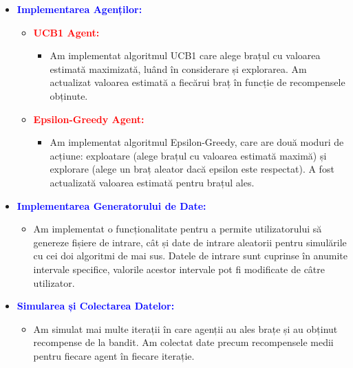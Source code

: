 \documentclass{article}
\begin{document}
\begin{itemize}
\item\textbf{\textcolor{blue}{Implementarea Agenților:}} \vspace{2mm}
\begin{itemize}
      \item \textbf{\textcolor{red}{UCB1 Agent:}} \vspace{2mm}
      \begin{itemize}
         \item  Am implementat algoritmul UCB1 care alege brațul cu valoarea estimată maximizată, luând în considerare și explorarea. Am actualizat valoarea estimată a fiecărui braț în funcție de recompensele obținute.\vspace{2mm}
      \end{itemize}
    \item \textbf{\textcolor{red}{Epsilon-Greedy Agent:}} \vspace{2mm}
      \begin{itemize}
         \item  Am implementat algoritmul Epsilon-Greedy, care are două moduri de acțiune: exploatare (alege brațul cu valoarea estimată maximă) și explorare (alege un braț aleator dacă epsilon este respectat). A fost actualizată valoarea estimată pentru brațul ales.\vspace{4mm}
      \end{itemize}
\end{itemize}

\item\textbf{\textcolor{blue}{Implementarea Generatorului de Date: }} \vspace{2mm}
\begin{itemize}
      \item  Am implementat o funcționalitate pentru a permite utilizatorului să genereze fișiere de intrare, cât și date de intrare aleatorii pentru simulările cu cei doi algoritmi de mai sus. Datele de intrare sunt cuprinse în anumite intervale specifice, valorile acestor intervale pot fi modificate de câtre utilizator.\vspace{2mm}
\end{itemize}

\item\textbf{\textcolor{blue}{Simularea și Colectarea Datelor:}} \vspace{2mm}
\begin{itemize}
      \item Am simulat mai multe iterații în care agenții au ales brațe și au obținut recompense de la bandit. Am colectat date precum recompensele medii pentru fiecare agent în fiecare iterație.\vspace{2mm}
\end{itemize}


\end{itemize}
\end{document}
